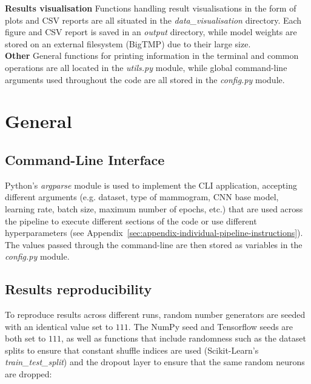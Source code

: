 \textbf{Results visualisation} \space Functions handling result visualisations in the form of plots and CSV reports are all situated in the \textit{data\_visualisation} directory. Each figure and CSV report is saved in an \textit{output} directory, while model weights are stored on an external filesystem (BigTMP) due to their large size.\\

\textbf{Other} \space General functions for printing information in the terminal and common operations are all located in the \textit{utils.py} module, while global command-line arguments used throughout the code are all stored in the \textit{config.py} module.


\section{General}

\subsection{Command-Line Interface}

Python's \textit{argparse} module is used to implement the CLI application, accepting different arguments (e.g. dataset,  type of mammogram, CNN base model, learning rate, batch size, maximum number of epochs, etc.) that are used across the pipeline to execute different sections of the code or use different hyperparameters (see Appendix~\ref{sec:appendix-individual-pipeline-instructions}). The values passed through the command-line are then stored as variables in the \textit{config.py} module.

\subsection{Results reproducibility}
\label{sec:implementation-results-reproducibility}

To reproduce results across different runs, random number generators are seeded with an identical value set to \textit{$111$}. The NumPy seed and Tensorflow seeds are both set to \textit{$111$}, as well as functions that include randomness such as the dataset splits to ensure that constant shuffle indices are used (Scikit-Learn's \textit{train\_test\_split}) and the dropout layer to ensure that the same random neurons are dropped:

